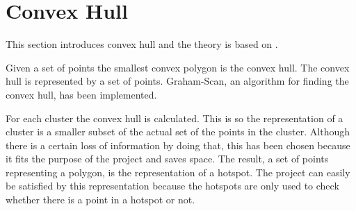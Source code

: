 \section{Convex Hull}\label{convex_hull}
This section introduces convex hull and the theory is based on \citet[section 33.3]{aadbook}.

Given a set of points the smallest convex polygon is the convex hull.
The convex hull is represented by a set of points.
Graham-Scan\cite[page 1031]{aadbook}, an algorithm for finding the convex hull, has been implemented.

For each cluster the convex hull is calculated.
This is so the representation of a cluster is a smaller subset of the actual set of the points in the cluster.
Although there is a certain loss of information by doing that, this has been chosen because it fits the purpose of the project and saves space.
The result, a set of points representing a polygon, is the representation of a hotspot.
The project can easily be satisfied by this representation because the hotspots are only used to check whether there is a point in a hotspot or not.